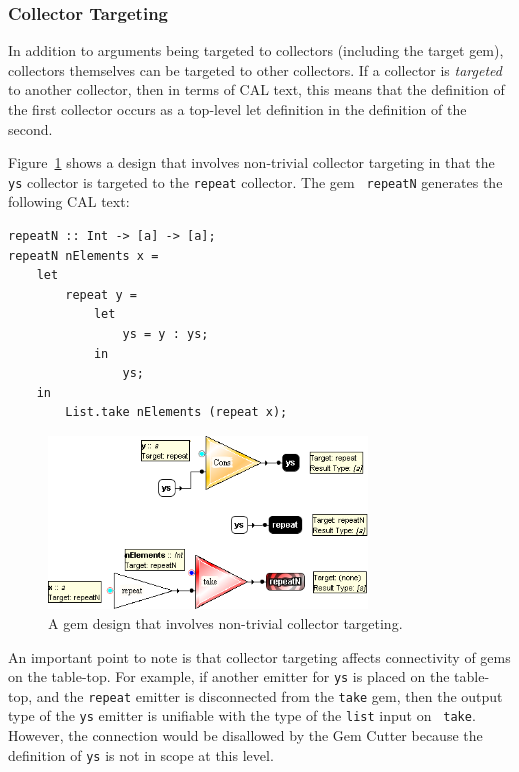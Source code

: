 \documentclass[preprint]{sigplanconf}
\begin{document}
\subsubsection{Collector Targeting}
\label{sec:collectorTargeting}

In addition to arguments being targeted to collectors (including the target
gem), collectors themselves can be targeted to other collectors. If a
collector is {\it targeted} to another collector, then in terms of CAL
text, this means that the definition of the first collector occurs as
a top-level let definition in the definition of the second.

Figure~\ref{fig:repeatN_collectorTargeting} shows a design that
involves non-trivial collector targeting in that the {\tt ys}
collector is targeted to the {\tt repeat} collector. The gem {\tt
repeatN} generates the following CAL text:
\begin{verbatim}
repeatN :: Int -> [a] -> [a];
repeatN nElements x = 
    let
        repeat y = 
            let
                ys = y : ys;
            in
                ys;
    in
        List.take nElements (repeat x);
\end{verbatim}

\begin{figure}[htb]
  \centering
  \includegraphics[width=20pc]{repeatN_collectorTargeting.png}
  \caption{A gem design that involves non-trivial collector targeting.}
  \label{fig:repeatN_collectorTargeting}
\end{figure}

An important point to note is that collector targeting affects
connectivity of gems on the table-top. For example, if another emitter
for {\tt ys} is placed on the table-top, and the {\tt repeat} emitter
is disconnected from the {\tt take} gem, then the output type of the {\tt ys}
emitter is unifiable with the type of the {\tt list} input on {\tt
take}. However, the connection would be disallowed by the Gem Cutter
because the definition of {\tt ys} is not in scope at this
level.
\end{document}
